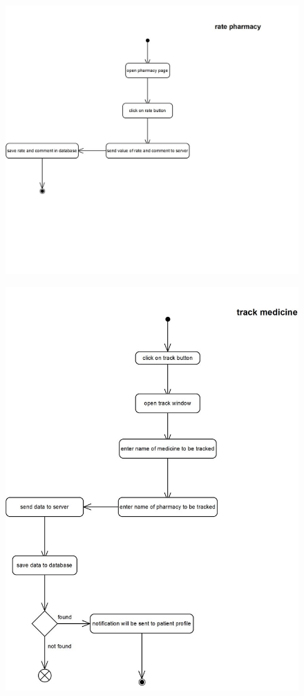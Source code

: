\documentclass[]{article}
\begin{document}
\begin{figure}[H]
\centering
\includegraphics[scale=0.6]{./activity/06}
\end{figure}
\begin{figure}[H]
\centering
\includegraphics[scale=0.6]{./activity/07}
\end{figure}
\end{document}
